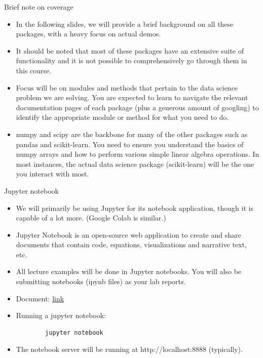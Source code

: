\documentclass[aspectratio=169]{beamer}
\begin{document}
\begin{frame}{Brief note on coverage}
    \begin{itemize}
        \item In the following slides, we will provide a brief background on all these packages, with a heavy focus on actual demos.
        \item It should be noted that most of these packages have an extensive suite of functionality and it is not possible to comprehensively go through them in this course. 
        \item Focus will be on modules and methods that pertain to the data science problem we are solving. You are expected to learn to navigate the relevant documentation pages of each package (plus a generous amount of googling) to identify the appropriate module or method for what you need to do.
        \item numpy and scipy are the backbone for many of the other packages such as pandas and scikit-learn. You need to ensure you understand the basics of numpy arrays and how to perform various simple linear algebra operations. In most instances, the actual data science package (scikit-learn) will be the one you interact with most.
    \end{itemize}
\end{frame} 


\begin{frame}[fragile]{Jupyter notebook}
    \begin{itemize}
        \item We will primarily be using Jupyter for its notebook application, though it is capable of a lot more. (Google Colab is similar.)
        \item Jupyter Notebook is an open-source web application to create and share documents that contain code, equations, visualizations and narrative text, etc.
        \item All lecture examples will be done in Jupyter notebooks. You will also be submitting notebooks (ipynb files) as your lab reports.
        \item Document: \href{http://jupyter-notebook.readthedocs.io/en/stable/}{link}
        \item Running a jupyter notebook:
        \begin{verbatim}
        jupyter notebook
        \end{verbatim}
        \item The notebook server will be running at http://localhost:8888 (typically).
    \end{itemize}
\end{frame}
\end{document}
